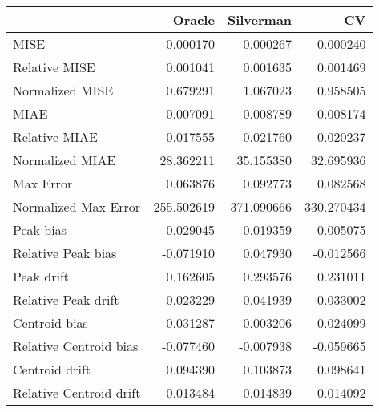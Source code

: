 \begin{tabular}{lrrr}
  \hline
 & Oracle & Silverman & CV \\ 
  \hline
MISE & 0.000170 & 0.000267 & 0.000240 \\ 
  Relative MISE & 0.001041 & 0.001635 & 0.001469 \\ 
  Normalized MISE & 0.679291 & 1.067023 & 0.958505 \\ 
  MIAE & 0.007091 & 0.008789 & 0.008174 \\ 
  Relative MIAE & 0.017555 & 0.021760 & 0.020237 \\ 
  Normalized MIAE & 28.362211 & 35.155380 & 32.695936 \\ 
  Max Error & 0.063876 & 0.092773 & 0.082568 \\ 
  Normalized Max Error & 255.502619 & 371.090666 & 330.270434 \\ 
  Peak bias & -0.029045 & 0.019359 & -0.005075 \\ 
  Relative Peak bias & -0.071910 & 0.047930 & -0.012566 \\ 
  Peak drift & 0.162605 & 0.293576 & 0.231011 \\ 
  Relative Peak drift & 0.023229 & 0.041939 & 0.033002 \\ 
  Centroid bias & -0.031287 & -0.003206 & -0.024099 \\ 
  Relative Centroid bias & -0.077460 & -0.007938 & -0.059665 \\ 
  Centroid drift & 0.094390 & 0.103873 & 0.098641 \\ 
  Relative Centroid drift & 0.013484 & 0.014839 & 0.014092 \\ 
   \hline
\end{tabular}
